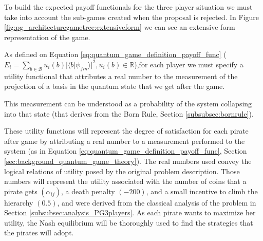 To build the expected payoff functionals for the three player situation we must take into account the sub-games created when the proposal is rejected. In Figure \ref{fig:pg_architecturegametree:extensiveform} we can see an extensive form representation of the game.

As defined on Equation \ref{eq:quantum_game_definition_payoff_func} ($ E_{i}=\sum_{b \in \mathcal{B}} u_{i}(b)\vert \langle b\vert \psi_{fin}\rangle\vert^{2}, u_{i}(b) \in \mathbb{R} $),for each player we must specify a utility functional that attributes a real number to the measurement of the projection of a basis in the quantum state that we get after the game. 


This measurement can be understood as a probability of the system collapsing into that state (that derives from the Born Rule, Section \ref{subsubsec:bornrule}).


These utility functions will represent the degree of satisfaction for each pirate after game by attributing a real number to a measurement performed to the system (as in Equation \ref{eq:quantum_game_definition_payoff_func}, Section \ref{sec:background_quantum_game_theory}). 
The real numbers used convey the logical relations of utility posed by the original problem description. Those numbers will represent the utility associated with the number of coins that a pirate gets $(\alpha_{ij})$, a death penalty $(-200)$, and a small incentive to climb the hierarchy $(0.5)$, and were derived from the classical analysis of the problem in Section \ref{subsubsec:analysis_PG3players}. 
As each pirate wants to maximize her utility, the Nash equilibrium will be thoroughly used to find the strategies that the pirates will adopt\cite{nash50}\cite{Nash51}.


